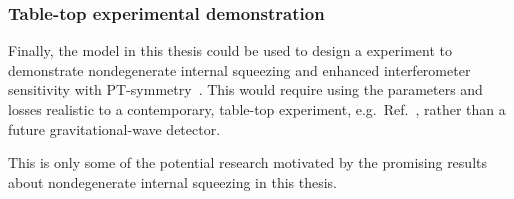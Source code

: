 
\subsubsection{Table-top experimental demonstration}

Finally, the model in this thesis could be used to design a experiment to demonstrate nondegenerate internal squeezing and enhanced interferometer sensitivity with PT-symmetry~\cite{}. This would require using the parameters and losses realistic to a contemporary, table-top experiment, e.g.\ Ref.~\cite{}, rather than a future gravitational-wave detector.

This is only some of the potential research motivated by the promising results about nondegenerate internal squeezing in this thesis.

